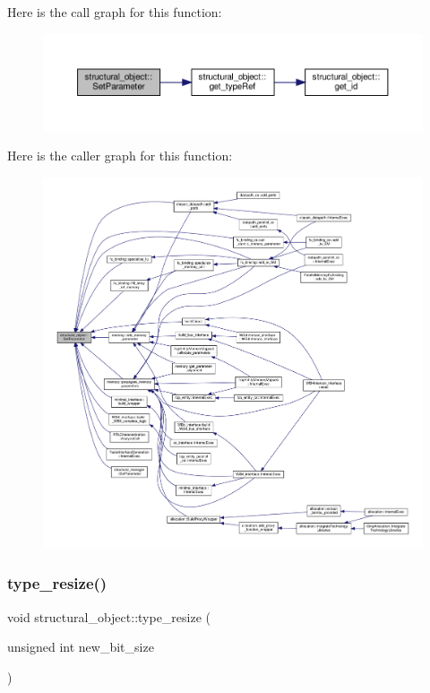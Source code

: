 Here is the call graph for this function\+:
\nopagebreak
\begin{figure}[H]
\begin{center}
\leavevmode
\includegraphics[width=350pt]{d8/da3/classstructural__object_a169dc4335ea6a4d40283315b8c30a3a9_cgraph}
\end{center}
\end{figure}
Here is the caller graph for this function\+:
\nopagebreak
\begin{figure}[H]
\begin{center}
\leavevmode
\includegraphics[width=350pt]{d8/da3/classstructural__object_a169dc4335ea6a4d40283315b8c30a3a9_icgraph}
\end{center}
\end{figure}
\mbox{\label{classstructural__object_a9a5e80fe9e81e9ea7e24b05733518e58}} 
\subsubsection{\texorpdfstring{type\+\_\+resize()}{type\_resize()}\hspace{0.1cm}{\footnotesize\ttfamily [1/2]}}
{\footnotesize\ttfamily void structural\+\_\+object\+::type\+\_\+resize (\begin{DoxyParamCaption}\item[{unsigned int}]{new\+\_\+bit\+\_\+size }\end{DoxyParamCaption})}



